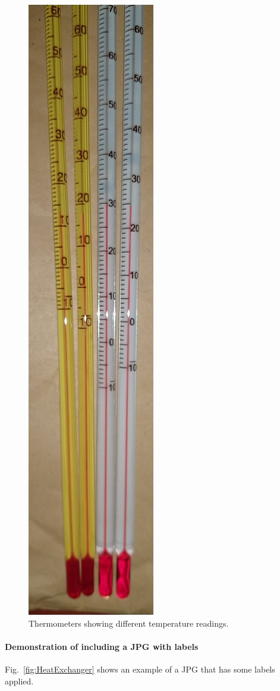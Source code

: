 \begin{figure}[H]
	\centering
	\includegraphics[height=1\textwidth, angle=90]{600-Appendices/Examples/Thermometer.jpg}
	\caption{Thermometers showing different temperature readings.}
	\label{fig:ndulogo}
\end{figure}

\newpage

\paragraph{Demonstration of including a JPG with labels}
Fig.~\ref{fig:HeatExchanger} shows an example of a JPG that has some labels applied.

